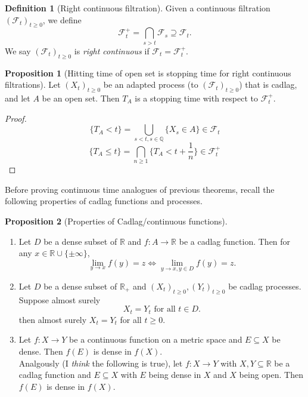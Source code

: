 \documentclass[parskip=full]{article}
\theoremstyle{definition}
\newtheorem*{definition}{Definition}
\newtheorem{proposition}{Proposition}[section]
\newcommand{\R}{\mathbb{R}}
\newcommand{\Q}{\mathbb{Q}}
\newcommand{\1}{\mathbbm{1}}
\begin{document}
\begin{definition}[Right continuous filtration]
  Given a continuous filtration $(\mathcal{F}_t)_{t \geq 0}$, we define
  \[
    \mathcal{F}_t^+ = \bigcap_{s > t} \mathcal{F}_s \supseteq \mathcal{F}_t.
  \]
  We say $(\mathcal{F}_t)_{t \geq 0}$ is \emph{right continuous} if $\mathcal{F}_t = \mathcal{F}_t^+$.
\end{definition}

\begin{proposition}[Hitting time of open set is stopping time for right continuous filtrations]
  Let $(X_t)_{t \geq 0}$ be an adapted process (to $(\mathcal{F}_{t})_{t \geq 0}$) that is cadlag, and let $A$ be an open set. Then $T_A$ is a stopping time with respect to $\mathcal{F}_t^+$.
\end{proposition}

\begin{proof}
  \[
    \{T_A < t\} = \bigcup_{s < t, s \in \Q} \{X_s \in A\} \in \mathcal{F}_t
  \]
  \[
    \{T_A \leq t\} = \bigcap_{n \geq 1} \{T_A < t + \frac{1}{n}\} \in \mathcal{F}_t^+
  \]
\end{proof}

Before proving continuous time analogues of previous theorems, recall the following properties of cadlag functions and processes.

\begin{proposition}[Properties of Cadlag/continuous functions]
  \begin{enumerate}
    \item Let $D$ be a dense subset of $\R$ and $f: A \to \R$ be a cadlag function. Then for any $x \in \R \cup \{\pm \infty\}$, 
    \[
      \lim_{y \to x} f(y) = z \iff \lim_{y \to x, y \in D} f(y) = z.
    \] 
    \item Let $D$ be a dense subset of $\R_+$ and $(X_t)_{t \geq 0}, (Y_t)_{t \geq 0}$ be cadlag processes. Suppose almost surely
    \[
      X_t = Y_t \text{ for all } t \in D.
    \]
    then almost surely $X_t = Y_t$ for all $t \geq 0$.
    \item  Let $f: X \to Y$ be a continuous function on a metric space and $E \subseteq X$ be dense. Then $f(E)$ is dense in $f(X)$.
    \\
    Analgously (I \emph{think} the following is true), let $f: X \to Y$ with $X, Y \subseteq \R$ be a cadlag function and $E \subseteq X$ with $E$ being dense in $X$ and $X$ being open. Then $f(E)$ is dense in $f(X)$.
  \end{enumerate}

\end{proposition}
\end{document}
